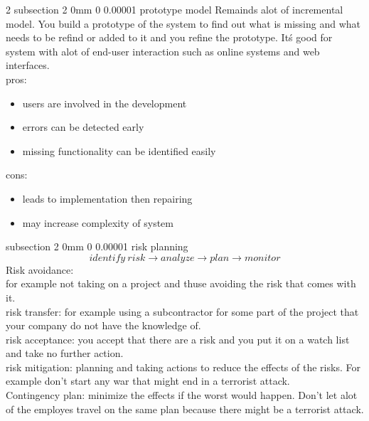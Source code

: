\documentclass[a4paper,11pt]{article}
\makeatletter
\renewcommand{\subsection}{\@startsection
   {subsection}%
   {2}%
   {0mm}%
   {0\baselineskip}%
   {0.00001\baselineskip}%
   {\rmfamily\normalfont\slshape\normalsize}}%
\makeatother
\begin{document}
\begin{multicols}{2}
\subsection{prototype model}
Remainds alot of incremental model. You build a prototype of the system to find out what is missing and what needs to be refind or added to it and you refine the prototype. Itś good for system with alot of end-user interaction such as online systems and web interfaces. 
\\pros:
\vspace{0 mm}
\begin{itemize}
 \setlength\itemsep{0em}
\item users are involved in the development
\item errors can be detected early
\item missing functionality can be identified easily
\end{itemize}
cons:
\vspace{0 mm}
\begin{itemize}
 \setlength\itemsep{0em}
\item leads to implementation then repairing
\item may increase complexity of system
\end{itemize}

\subsection{risk planning}
$$identify\: risk\rightarrow analyze\rightarrow plan\rightarrow monitor $$
Risk avoidance:
\\ for example not taking on a project and thuse avoiding the risk that comes with it.
\\risk transfer:
for example using a subcontractor for some part of the project that your company do not have the knowledge of.
\\risk acceptance:
you accept that there are a risk and you put it on a watch list and take no further action.
\\risk mitigation:
planning and taking actions to reduce the effects of the risks. For example don't start any war that might end in a terrorist attack.
\\Contingency plan: minimize the effects if the worst would happen. Don't let alot of the employes travel on the same plan because there might be a terrorist attack.


\end{multicols}
\end{document}

